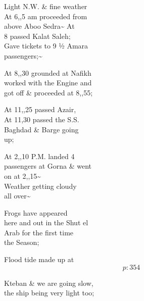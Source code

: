 \documentclass{report}
\begin{document}
	\par{
 	Light N.W. \& fine weather\ \\At 6,,5 am proceeded from\ \\above Aboo Sedra\~{} At\ \\8 passed Kalat Saleh;\ \\Gave tickets to 9 ½ Amara\ \\passengers;\~{}\ \\
	}

	\par{
 	At 8,,30 grounded at Nafikh\ \\worked with the Engine and\ \\got off \& proceeded at 8,,55;\ \\
	}

	\par{
 	At 11,,25 passed Azair,\ \\At 11,30 passed the S.S.\ \\Baghdad \& Barge going\ \\up;\ \\
	}

	\par{
 	At 2,,10 P.M. landed 4\ \\passengers at Gorna \& went\ \\on at 2,,15\~{}\ \\Weather getting cloudy\ \\all over\~{}\ \\
	}

	\par{
 	Frogs have appeared\ \\here and out in the Shut el\ \\Arab for the first time\ \\the Season;\ \\
	}

	\par{
 	Flood tide made up at\ \\
  \[p: 354 \]

	}

	\par{
 	Kteban \& we are going slow,\ \\the ship being very light too;\ \\
	}
\end{document}
